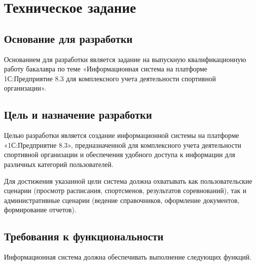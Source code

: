 \section{Техническое задание}

\subsection{Основание для разработки}

Основанием для разработки является задание на выпускную квалификационную работу бакалавра по теме «Информационная система на платформе 1С:Предприятие 8.3 для комплексного учета деятельности спортивной организации».

\subsection{Цель и назначение разработки}

Целью разработки является создание информационной системы на платформе «1С:Предприятие 8.3», предназначенной для комплексного учета деятельности спортивной организации и обеспечения удобного доступа к информации для различных категорий пользователей.

Для достижения указанной цели система должна охватывать как пользовательские сценарии (просмотр расписания, спортсменов, результатов соревнований), так и административные сценарии (ведение справочников, оформление документов, формирование отчетов).

\subsection{Требования к функциональности}

Информационная система должна обеспечивать выполнение следующих функций.

